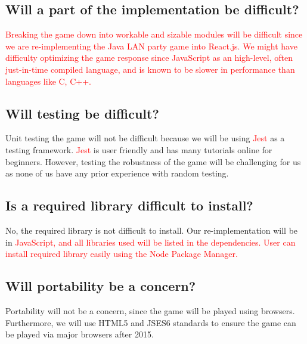 \documentclass{article}
\begin{document}
\subsection{Will a part of the implementation be difficult?}
\textcolor{red}{
Breaking the game down into workable and sizable modules will be difficult since we are re-implementing the Java LAN party game into React.js. We might have difficulty optimizing the game response since JavaScript as an high-level, often just-in-time compiled language, and is known to be slower in performance than languages like C, C++.}
\subsection{Will testing be difficult?}
Unit testing the game will not be difficult because we will be using \textcolor{red}{Jest} as a testing framework. \textcolor{red}{Jest} is user friendly and has many tutorials online for beginners. However, testing the robustness of the game will be challenging for us as none of us have any prior experience with random testing.

\subsection{Is a required library difficult to install?}
No, the required library is not difficult to install. Our re-implementation will be in \textcolor{red}{JavaScript, and all libraries used will be listed in the dependencies. User can install required library easily using the Node Package Manager.}

\subsection{Will portability be a concern?}
Portability will not be a concern, since the game will be played using browsers. Furthermore, we will use HTML5 and JSES6 standards to ensure the game can be played via major browsers after 2015.
\end{document}
